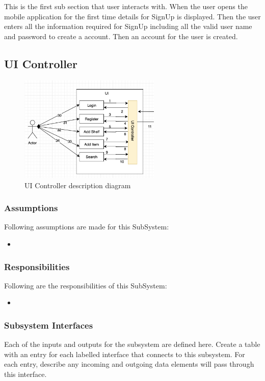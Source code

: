 This is the first sub section that user interacts with. When the user opens the mobile application for the first time details for SignUp is displayed. Then the user enters all the information required for SignUp including all the valid user name and password to create a account. Then an account for the user is created.

\subsection{UI Controller}


\begin{figure}[h!]
	\centering
 	\includegraphics[width=0.60\textwidth]{images/uicontroller}
 \caption{UI Controller description diagram}
\end{figure}

\subsubsection{Assumptions}
Following assumptions are made for this SubSystem:
\begin{itemize}
    \item 
\end{itemize}

\subsubsection{Responsibilities}
Following are the responsibilities of this SubSystem:
\begin{itemize}
    \item 
\end{itemize}

\subsubsection{Subsystem Interfaces}
Each of the inputs and outputs for the subsystem are defined here. Create a table with an entry for each labelled interface that connects to this subsystem. For each entry, describe any incoming and outgoing data elements will pass through this interface.

